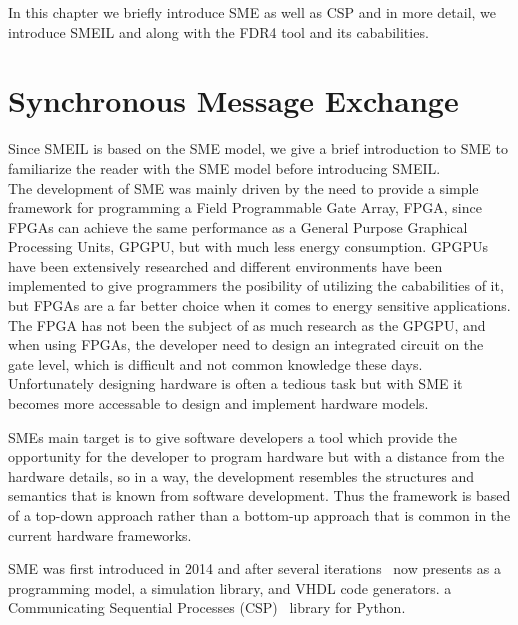 In this chapter we briefly introduce SME as well as CSP and in more detail, we introduce SMEIL and \cspm along with the FDR4 tool and its cababilities.

\section{Synchronous Message Exchange}
Since SMEIL is based on the SME model, we give a brief introduction to SME to familiarize the reader with the SME model before introducing SMEIL.
\\

The development of SME was mainly driven by the need to provide a simple framework for programming a Field Programmable Gate
Array, FPGA, since FPGAs can achieve the same performance as a General Purpose Graphical Processing Units, GPGPU, but with much less energy consumption. GPGPUs have been extensively researched and different environments have been implemented to give programmers the posibility of utilizing the cababilities of it, but FPGAs are a far better choice when it comes to energy sensitive applications. The FPGA has not been the subject of as much research as the GPGPU, and when using FPGAs, the developer need to design an integrated circuit on the gate level, which is difficult and not common knowledge these days.
Unfortunately designing hardware is often a tedious task but with SME it becomes more accessable to design and implement hardware models.

SMEs main target is to give software developers a tool which provide the opportunity for the developer to program hardware but with a distance from the hardware details, so in a way, the development resembles the structures and semantics that is known from software development.
Thus the framework is based of a top-down approach rather than a bottom-up approach that is common in the current hardware frameworks.

SME was first introduced in 2014 and after several iterations~\cite{Vinter2014, Vinter2015, Skovhede} now presents as a programming model, a simulation library, and VHDL code generators. %
a Communicating Sequential Processes (CSP)~\cite{Hoare1978} library for Python.\\

